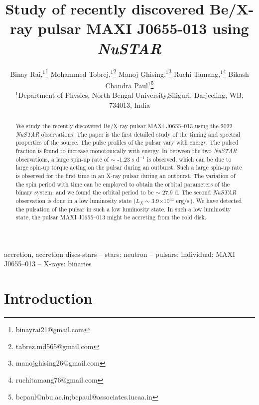 \documentclass[12pt,a4paper,fleqn,usenatbib]{mnras}
\title[MAXI J0655-013]{Study of recently discovered Be/X-ray pulsar MAXI J0655-013 using \emph{NuSTAR}}
\author[Rai et al.]
{Binay Rai,$^{1}$\thanks{binayrai21@gmail.com}
Mohammed Tobrej,$^{1}$\thanks{tabrez.md565@gmail.com} 
Manoj Ghising,$^{1}$\thanks{manojghising26@gmail.com}
Ruchi Tamang,$^{1}$\thanks{ruchitamang76@gmail.com}
\newauthor
Bikash Chandra Paul$^{1}$\thanks{bcpaul@nbu.ac.in;bcpaul@associates.iucaa.in}
\\
$^{1}$Department of Physics, North Bengal University,Siliguri, Darjeeling, WB, 734013, India
\\
}
\newcommand{\unilum}{$\text{erg}/\text{s}\,$}
\begin{document}
\label{firstpage}
\pagerange{\pageref{firstpage}--\pageref{lastpage}}
\maketitle
\begin{abstract}
We study the recently discovered Be/X-ray pulsar MAXI J0655--013 using the 2022 \emph{NuSTAR} observations. The paper is the first detailed study of the timing and spectral properties of the source. The pulse profiles of the pulsar vary with energy. The pulsed fraction is found to increase monotonically with energy. In between the two \emph{NuSTAR} observations, a large spin-up rate of $\sim$ -1.23 s d$^{-1}$ is observed, which can be due to large spin-up torque acting on the pulsar during an outburst. Such a large spin-up rate is observed for the first time in an X-ray pulsar during an outburst. The variation of the spin period with time can be employed to obtain the orbital parameters of the binary system, and we found the orbital period to be $\sim$ 27.9 d. The second \emph{NuSTAR} observation is done in a low luminosity state ($L_{X} \sim$3.9$\times$10$^{34}$ \unilum). We have detected the pulsation of the pulsar in such a low luminosity state. In such a low luminosity state, the pulsar MAXI J0655--013 might be accreting from the cold disk.
\end{abstract}

\begin{keywords}
accretion, accretion discs-stars -- stars: neutron -- pulsars: individual: MAXI J0655--013 -- X-rays: binaries
\end{keywords}



%
%
\section{Introduction}
\end{document}
